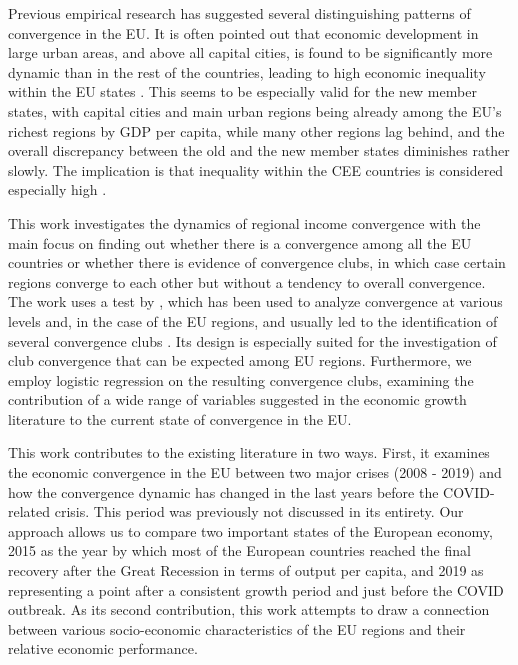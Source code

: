 \documentclass[11pt]{article}
\begin{document}
Previous empirical research has suggested several distinguishing patterns of convergence in the EU. It is often pointed out that economic development in large urban areas, and above all capital cities, is found to be significantly more dynamic than in the rest of the countries, leading to high economic inequality within the EU states \citep{geppert2008regional}. This seems to be especially valid for the new member states, with capital cities and main urban regions being already among the EU's richest regions by GDP per capita, while many other regions lag behind, and the overall discrepancy between the old and the new member states diminishes rather slowly. The implication is that inequality within the CEE countries is considered especially high \citep{geppert2008regional,sme2012regional, smketkowski2013regional}.


This work investigates the dynamics of regional income convergence with the main focus on finding out whether there is a convergence among all the EU countries or whether there is evidence of convergence clubs, in which case certain regions converge to each other but without a tendency to overall convergence. The work uses a test by \citet{phillips2007transition}, which has been used to analyze convergence at various levels and, in the case of the EU regions, and usually led to the identification of several convergence clubs \citep{bartkowska2012regional, borsi2015evolution, von2017regional}. Its design is especially suited for the investigation of club convergence that can be expected among EU regions. Furthermore, we employ logistic regression on the resulting convergence clubs, examining the contribution of a wide range of variables suggested in the economic growth literature to the current state of convergence in the EU.

This work contributes to the existing literature in two ways. First, it examines the economic convergence in the EU between two major crises (2008 - 2019) and how the convergence dynamic has changed in the last years before the COVID-related crisis. This period was previously not discussed in its entirety. Our approach allows us to compare two important states of the European economy, 2015 as the year by which most of the European countries reached the final recovery after the Great Recession in terms of output per capita, and 2019 as representing a point after a consistent growth period and just before the COVID outbreak. As its second contribution, this work attempts to draw a connection between various socio-economic characteristics of the EU regions and their relative economic performance.
\end{document}
